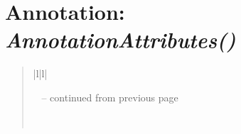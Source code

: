 \documentclass[letterpaper,10pt,english]{sphinxmanual}
\begin{document}
\section{\textbf{Annotation}: \emph{AnnotationAttributes()}}
\label{attributes:annotation-annotationattributes}
\begin{DUlineblock}{0em}
\item[] 
\end{DUlineblock}
\begin{quote}

\begin{longtable}{|l|l|}
\hline
\endfirsthead

%
{{\textsf{\tablename\ \thetable{} -- continued from previous page}}} \\
\hline
\endhead

\hline {} \\ \hline
\endfoot

\endlastfoot



\end{longtable}
\end{quote}
\end{document}
